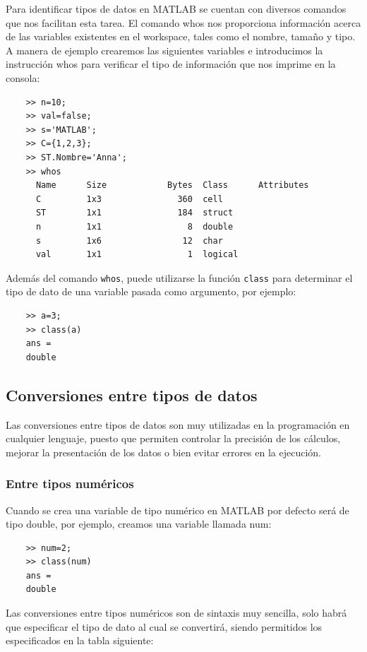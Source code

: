 Para identificar tipos de datos en MATLAB se cuentan con diversos comandos que nos facilitan esta tarea. 
El comando whos nos proporciona información acerca de las variables existentes en el workspace, tales 
como el nombre, tamaño y tipo. A manera de ejemplo crearemos las siguientes variables e introducimos la 
instrucción whos para verificar el tipo de información que nos imprime en la consola:

\begin{verbatim}
 	>> n=10;
	>> val=false;
	>> s='MATLAB';
	>> C={1,2,3};
	>> ST.Nombre='Anna';
	>> whos
	  Name      Size            Bytes  Class      Attributes
	  C         1x3               360  cell                 
	  ST        1x1               184  struct               
	  n         1x1                 8  double               
	  s         1x6                12  char                 
	  val       1x1                 1  logical      
 \end{verbatim} 


Además del comando \texttt{whos}, puede utilizarse la función \texttt{class} para determinar el tipo de dato de una 
variable pasada como argumento, por ejemplo:

\begin{verbatim}
	>> a=3;
	>> class(a)
	ans =
	double
\end{verbatim}

\subsection{Conversiones entre tipos de datos}

Las conversiones entre tipos de datos son muy utilizadas en la programación en cualquier lenguaje, 
puesto que permiten controlar la precisión de los cálculos, mejorar la presentación de los datos o 
bien evitar errores en la ejecución.

\subsubsection{Entre tipos numéricos}

Cuando se crea una variable de tipo numérico en MATLAB por defecto será de tipo double, por ejemplo, 
creamos una variable llamada num:

\begin{verbatim}
	>> num=2;
	>> class(num)
	ans =
	double
\end{verbatim}

Las conversiones entre tipos numéricos son de sintaxis muy sencilla, solo habrá que especificar el 
tipo de dato al cual se convertirá, siendo permitidos los especificados en la tabla siguiente:\\

